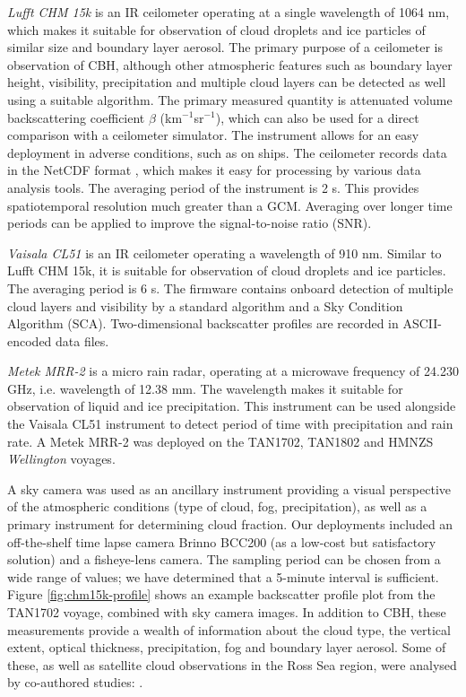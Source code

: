 \textit{Lufft CHM 15k} is an IR ceilometer operating at a single wavelength of
1064 nm, which makes it suitable for observation of cloud droplets and
ice particles of similar size and boundary layer aerosol.
The primary purpose of a ceilometer
is observation of CBH, although other atmospheric features
such as boundary layer height, visibility, precipitation and multiple
cloud layers can be detected as well using a suitable algorithm. The
primary measured quantity is attenuated volume backscattering coefficient
$\beta$ (km$^{-1}$sr$^{-1}$), which
can also be used for a direct comparison with a ceilometer simulator.
The instrument allows for an easy deployment
in adverse conditions, such as on ships.
The ceilometer records data in the NetCDF format \citep{rew2006},
which makes it easy
for processing by various data analysis tools.
The averaging period of the instrument is 2 s. This provides spatiotemporal
resolution much greater than a GCM. Averaging over longer time periods can be applied to improve the signal-to-noise ratio (SNR).

\textit{Vaisala CL51} is an IR ceilometer operating a
wavelength of 910 nm. Similar to Lufft CHM 15k, it is suitable for observation
of cloud droplets and ice particles. The averaging period is 6 s.
The firmware contains onboard detection of multiple cloud layers and
visibility by a standard algorithm and a Sky Condition Algorithm (SCA).
Two-dimensional backscatter profiles are recorded in ASCII-encoded data files.

\textit{Metek MRR-2} is a micro rain radar, operating at a microwave frequency of
24.230 GHz, i.e. wavelength of 12.38 mm. The wavelength makes it suitable
for observation of liquid and ice precipitation. This instrument can
be used alongside the Vaisala CL51 instrument to detect period of time with
precipitation and rain rate. A Metek MRR-2 was deployed on the TAN1702, TAN1802
and HMNZS \textit{Wellington} voyages.

A sky camera was used as an ancillary instrument providing a visual
perspective of the atmospheric conditions (type of cloud, fog,
precipitation), as well as a primary instrument for determining cloud fraction.
Our deployments included
an off-the-shelf time lapse camera Brinno BCC200 (as a low-cost but
satisfactory solution) and a fisheye-lens camera.
The sampling period can be chosen from a wide range of values; we have
determined that a 5-minute interval is sufficient.
Figure \ref{fig:chm15k-profile} shows an example backscatter profile plot
from the TAN1702 voyage, combined with sky camera images. 
In addition to CBH, these measurements provide a wealth
of information about the cloud type, the vertical extent, optical thickness,
precipitation, fog and boundary layer aerosol. Some of these, as well
as satellite cloud observations in the Ross Sea region, were analysed
by co-authored studies: \cite{klekociuk2018,jolly2018,hartery2020a,hartery2020b}.

